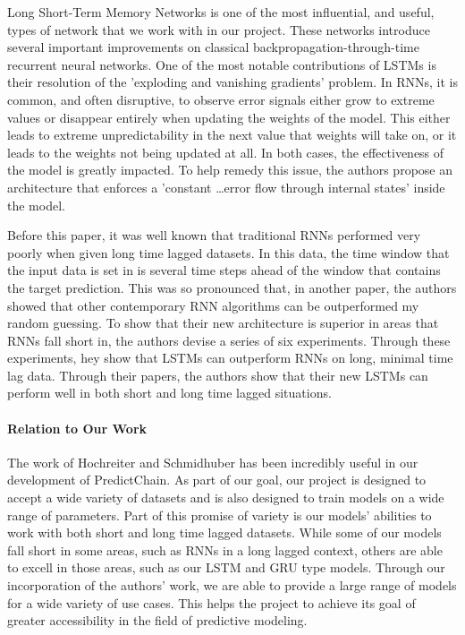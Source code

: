 \documentclass{article}
\begin{document}
    Long Short-Term Memory Networks\cite{LSTM} is one of the most influential, and useful, types of network that we work
    with in our project.  These networks introduce several important improvements on classical backpropagation-through-time
    recurrent neural networks.  One of the most notable contributions of LSTMs is their resolution of the 'exploding
    and vanishing gradients' problem.  In RNNs, it is common, and often disruptive, to observe error signals either
    grow to extreme values or disappear entirely when updating the weights of the model.  This either leads to
    extreme unpredictability in the next value that weights will take on, or it leads to the weights not being
    updated at all. In both cases, the effectiveness of the model is greatly impacted.  To help remedy this issue,
    the authors propose an architecture that enforces a 'constant \ldots error flow through internal states' inside the
    model.

    Before this paper, it was well known that traditional RNNs performed very poorly when given long time lagged
    datasets.   In this data, the time window that the input data is set in is several time steps ahead of the window
    that contains the target prediction.  This was so pronounced that, in another paper\cite{weightGuessing}, the authors
    showed that other contemporary RNN algorithms can be outperformed my random guessing.  To show that their new
    architecture is superior in areas that RNNs fall short in, the authors devise a series of six experiments.
    Through these experiments, hey show that LSTMs can outperform RNNs on long, minimal time lag data.  Through their
    papers, the authors show that their new LSTMs can perform well in both short and long time lagged situations.

    \paragraph{Relation to Our Work}

    The work of Hochreiter and Schmidhuber has been incredibly useful in our development of PredictChain.  As part of
    our goal, our project is designed to accept a wide variety of datasets and is also designed to train models on
    a wide range of parameters.  Part of this promise of variety is our models' abilities to work with both short
    and long time lagged datasets.  While some of our models fall short in some areas, such as RNNs in a long lagged
    context, others are able to excell in those areas, such as our LSTM and GRU type models.  Through our incorporation
    of the authors' work, we are able to provide a large range of models for a wide variety of use cases.  This helps
    the project to achieve its goal of greater accessibility in the field of predictive modeling.
\end{document}
